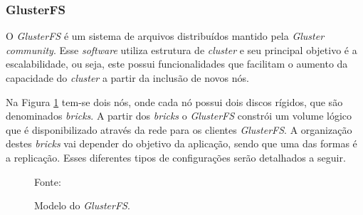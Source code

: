 \subsubsection{GlusterFS}
\label{section:glusterfs}
O \textit{GlusterFS} \cite{glusterfs} é um sistema de arquivos distribuídos mantido pela \textit{Gluster community}. Esse \textit{software} 
utiliza estrutura de \textit{cluster} e seu principal objetivo é a escalabilidade, ou seja, este possui funcionalidades que facilitam o aumento
da capacidade do \textit{cluster} a partir da inclusão de novos nós.

Na Figura \ref{fig:glusterfs} tem-se dois nós, onde cada nó possui dois discos rígidos, que são denominados \textit{bricks}. 
A partir dos \textit{bricks} o \textit{GlusterFS} constrói um volume lógico que é disponibilizado através da rede para os clientes 
\textit{GlusterFS}. A organização destes \textit{bricks} vai depender do objetivo da aplicação, sendo que uma das formas é a replicação. Esses 
diferentes tipos de configurações serão detalhados a seguir.

\begin{figure}[h!]
 \centering
 \caption{Modelo do \textit{GlusterFS}.}
 Fonte: \citet{davies2013}
 \label{fig:glusterfs}
\end{figure}

